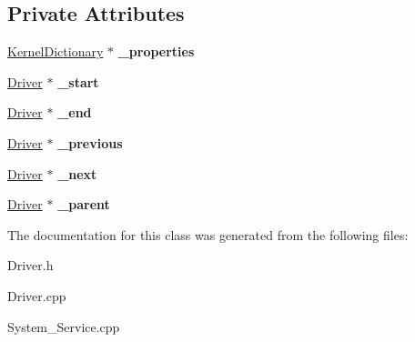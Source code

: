 \subsection*{Private Attributes}
\begin{DoxyCompactItemize}
\item 
\mbox{\label{class_driver_adbbee28d4b7694ead1ce602ff0e9cccd}} 
\hyperlink{class_kernel_dictionary}{Kernel\+Dictionary} $\ast$ {\bfseries \+\_\+properties}
\item 
\mbox{\label{class_driver_a1d4e0938f1466041e9a23ab6e7854f6f}} 
\hyperlink{class_driver}{Driver} $\ast$ {\bfseries \+\_\+start}
\item 
\mbox{\label{class_driver_a797564a13d3d85ecfc540e6669c19117}} 
\hyperlink{class_driver}{Driver} $\ast$ {\bfseries \+\_\+end}
\item 
\mbox{\label{class_driver_a1bebc8c02511a8fc6d69b54bc7880ed2}} 
\hyperlink{class_driver}{Driver} $\ast$ {\bfseries \+\_\+previous}
\item 
\mbox{\label{class_driver_a10f419c14dea9d810246550a6da81e50}} 
\hyperlink{class_driver}{Driver} $\ast$ {\bfseries \+\_\+next}
\item 
\mbox{\label{class_driver_ae3e26aff77965a463f52fd27f47eadf3}} 
\hyperlink{class_driver}{Driver} $\ast$ {\bfseries \+\_\+parent}
\end{DoxyCompactItemize}


The documentation for this class was generated from the following files\+:\begin{DoxyCompactItemize}
\item 
Driver.\+h\item 
Driver.\+cpp\item 
System\+\_\+\+Service.\+cpp\end{DoxyCompactItemize}
